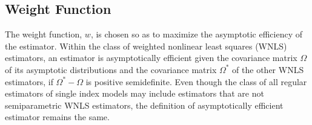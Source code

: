 \documentclass[a4paper]{article}
\begin{document}












\subsection{Weight Function} %
\label{sub:Weight Function}

The weight function, $w$, is chosen so as to maximize the asymptotic efficiency of the estimator. Within the class of weighted nonlinear least squares (WNLS) estimators, an estimator is asymptotically efficient given the covariance matrix $\Omega$ of its asymptotic distributions and the covariance matrix $\Omega^*$ of the other WNLS estimators, if $\Omega^* - \Omega$ is positive semidefinite. Even though the class of all regular estimators of single index models may include estimators that are not semiparametric WNLS estimators, the definition of asymptotically efficient estimator remains the same. 



\end{document}
